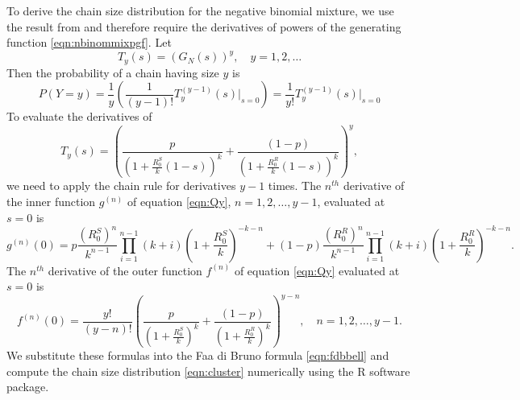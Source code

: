 \documentclass{imammb}
\numberwithin{equation}{section}
\begin{document}
To derive the chain size distribution for the negative binomial mixture, we use the result from \citet{Blumberg2013-xv} and therefore require the derivatives of powers of the generating function \eqref{eqn:nbinommixpgf}. Let $$T_y(s) =  (G_N(s))^y, \quad y = 1, 2, \dots $$ Then the probability of a chain having size $y$ \citep{Dwass1969-gs, Blumberg2013-xv} is
\begin{equation}\label{eqn:cluster}
    P(Y = y)  =\frac{1}{y}\left( \frac{1}{(y-1)!}T_y^{(y-1)}(s) \Bigr|_{s=0} \right ) =  \frac{1}{y!}T_y^{(y-1)}(s) \Bigr|_{s=0}
\end{equation}
To evaluate the derivatives of 
\begin{equation}\label{eqn:Qy}
   T_y(s)=  \left (\frac{p}{(1 + \frac{R_0^S}{k}(1-s))^k} +   \frac{(1-p)}{(1 + \frac{R_0^R}{k}(1-s))^k} \right)^y,
\end{equation}
we need to apply the chain rule for derivatives $y-1$ times.
The $n^{th}$ derivative of the inner function $g^{(n)}$ of equation \eqref{eqn:Qy},  $n = 1, 2, \dots, y-1$, evaluated at $s=0$ is
\begin{equation*}
    g^{(n)}(0) =  p \frac{(R_0^S)^n}{k^{n-1}} \displaystyle \prod_{i=1}^{n-1} (k+i) \left(1+\frac{R_0^S}{k}\right)^{-k-n}+ (1-p)\frac{(R_0^R)^n}{k^{n-1}} \displaystyle \prod_{i=1}^{n-1} (k+i)\left (1+\frac{R_0^R}{k}\right)^{-k-n}.
\end{equation*}
The $n^{th}$ derivative of the outer function $f^{(n)}$ of equation \eqref{eqn:Qy} evaluated at $s=0$ is
\begin{equation*}
    f^{(n)}(0) =  \frac{y!}{(y-n)! }\left (\frac{p}{(1 + \frac{R_0^S}{k})^k} +   \frac{(1-p)}{(1 + \frac{R_0^R}{k})^k} \right )^{y-n}, \quad n = 1, 2, \dots, y-1.
\end{equation*}
We substitute these formulas into the Faa di Bruno formula \eqref{eqn:fdbbell} and compute the chain size distribution \eqref{eqn:cluster} numerically using the R software package.

\end{document}
